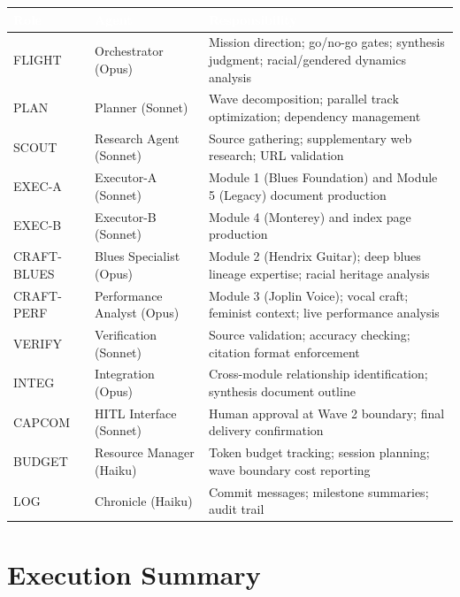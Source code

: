 \documentclass[11pt,letterpaper]{article}
\newcommand{\tableheader}[1]{\textbf{\sffamily\textcolor{white}{#1}}}
\begin{document}
\begin{center}
\begin{tabularx}{\textwidth}{L{2cm}L{3cm}X}
\toprule
{}
\tableheader{Role} & \tableheader{Agent} & \tableheader{Responsibility} \\
\midrule
FLIGHT & Orchestrator (Opus) & Mission direction; go/no-go gates; synthesis judgment; racial/gendered dynamics analysis \\
PLAN & Planner (Sonnet) & Wave decomposition; parallel track optimization; dependency management \\
SCOUT & Research Agent (Sonnet) & Source gathering; supplementary web research; URL validation \\
EXEC-A & Executor-A (Sonnet) & Module 1 (Blues Foundation) and Module 5 (Legacy) document production \\
EXEC-B & Executor-B (Sonnet) & Module 4 (Monterey) and index page production \\
CRAFT-BLUES & Blues Specialist (Opus) & Module 2 (Hendrix Guitar); deep blues lineage expertise; racial heritage analysis \\
CRAFT-PERF & Performance Analyst (Opus) & Module 3 (Joplin Voice); vocal craft; feminist context; live performance analysis \\
VERIFY & Verification (Sonnet) & Source validation; accuracy checking; citation format enforcement \\
INTEG & Integration (Opus) & Cross-module relationship identification; synthesis document outline \\
CAPCOM & HITL Interface (Sonnet) & Human approval at Wave 2 boundary; final delivery confirmation \\
BUDGET & Resource Manager (Haiku) & Token budget tracking; session planning; wave boundary cost reporting \\
LOG & Chronicle (Haiku) & Commit messages; milestone summaries; audit trail \\
\bottomrule
\end{tabularx}
\end{center}

\section{Execution Summary}
\end{document}
